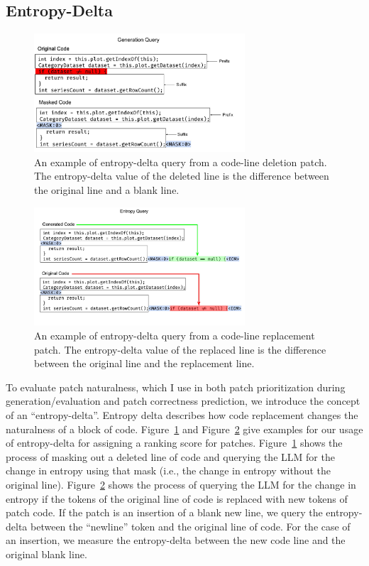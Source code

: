 \documentclass[12pt,openany,oneside,table]{cmuthesis}
\begin{document}
\subsection{Entropy-Delta}
\label{sec:entropy-delta}
\begin{figure}
\includegraphics[width=0.7\textwidth]{figures/approach/generation_query.pdf}
\caption{An example of entropy-delta query from a code-line deletion patch. The entropy-delta value of the deleted line is the difference between the original line and a blank line.}
\label{fig:deletion-method}
\end{figure}

\begin{figure}
  \includegraphics[width=0.7\textwidth]{figures/approach/entropy_query.pdf}
  \caption{An example of entropy-delta query from a code-line replacement patch. The entropy-delta value of the replaced line is the difference between the original line and the replacement line.}
  \label{fig:replacement-method}
\end{figure}

To evaluate patch naturalness, which I use in both patch prioritization during
generation/evaluation and patch correctness prediction, we introduce the concept of an
``entropy-delta''. Entropy delta describes how code replacement changes the naturalness
of a block of code. Figure~\ref{fig:deletion-method} and
Figure~\ref{fig:replacement-method} give examples for our usage of entropy-delta
for assigning a ranking score for patches. Figure~\ref{fig:deletion-method}
shows the process of masking out a deleted line of code and querying the LLM for
the change in entropy using that mask (i.e., the change in entropy without the original line). Figure~\ref{fig:replacement-method} shows
the process of querying the LLM for the change in entropy if the tokens of the
original line of code is replaced with new tokens of patch code. If the patch is
an insertion of a blank new line, we query the entropy-delta between the ``newline'' token and the original line of code.
For the case of an insertion, we measure the entropy-delta between the new code line and the original blank line.
\end{document}
